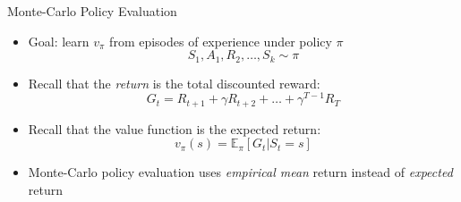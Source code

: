 \bgroup
\begin{frame}{Monte-Carlo Policy Evaluation}
\begin{itemize}
\item Goal: learn $v_{\pi}$ from episodes of experience under policy $\pi$
\begin{equation*}
S_1, A_1, R_2, \ldots, S_k \sim \pi
\end{equation*}
\item Recall that the \emph{return} is the total discounted reward:
\begin{equation*}
G_t = R_{t+1} + \gamma R_{t+2}+\ldots+\gamma^{T-1}R_T
\end{equation*}
\item Recall that the value function is the expected return:
\begin{equation*}
v_{\pi}(s) = \mathbb{E}_{\pi}[G_t | S_t = s]
\end{equation*}
\item Monte-Carlo policy evaluation uses \emph{empirical mean} return instead of \emph{expected} return
\end{itemize}
\end{frame}
\egroup
